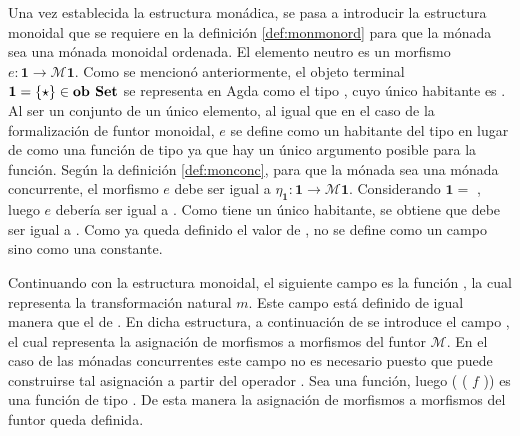 Una vez establecida la estructura monádica, se pasa a introducir la estructura monoidal que se requiere en la definición \ref{def:monmonord} para que la mónada sea una mónada monoidal ordenada. El elemento neutro es un morfismo $e : \mathbf{1} \rightarrow \mathcal{M} \mathbf{1}$. Como se mencionó anteriormente, el objeto terminal $\mathbf{1} = \{\star\} \in \text{\bf ob Set}$ se representa en Agda como el tipo \AgdaDatatype{$\top$}, cuyo único habitante es . Al ser un conjunto de un único elemento, al igual que en el caso de la formalización de funtor monoidal, $e$ se define como un habitante  del tipo  \AgdaDatatype{$\top$} en lugar de como una función de tipo \AgdaDatatype{$\top$} \AgdaSymbol{$\rightarrow$}  \AgdaDatatype{$\top$} ya que hay un único argumento posible para la función. Según la definición \ref{def:monconc}, para que la mónada sea una mónada concurrente, el morfismo $e$ debe ser igual a $\eta_{\mathbf{1}} : \mathbf{1} \rightarrow \mathcal{M} \mathbf{1}$. Considerando $\mathbf{1} =$ \AgdaDatatype{$\top$}, luego $e$ debería ser igual a  \AgdaSymbol{\{}\AgdaDatatype{$\top$}\AgdaSymbol{\} :} \AgdaDatatype{$\top$} \AgdaSymbol{$\rightarrow$}  \AgdaDatatype{$\top$}. Como \AgdaDatatype{$\top$} tiene un único habitante, se obtiene que  debe ser igual a   \AgdaSymbol{:}  \AgdaDatatype{$\top$}. Como ya queda definido el valor de , no se define como un campo sino como una constante.

Continuando con la estructura monoidal, el siguiente campo es la función , la cual representa la transformación natural $m$. Este campo está definido de igual manera que el  de . En dicha estructura, a continuación de  se introduce el campo , el cual representa la asignación de morfismos a morfismos del funtor $\mathcal{M}$. En el caso de las mónadas concurrentes este campo no es necesario puesto que puede construirse tal asignación a partir del operador \AgdaField{$\gg=$}. Sea  \AgdaSymbol{:}  \AgdaSymbol{$\rightarrow$}   una función, luego (\AgdaSymbol{$\lambda$}  \AgdaSymbol{$\rightarrow$}  \AgdaField{$\gg=$} (\AgdaSymbol{$\lambda$}  \AgdaSymbol{$\rightarrow$}  $f$ )) es una función de tipo  \AgdaSymbol{$\rightarrow$} . De esta manera la asignación de morfismos a morfismos del funtor queda definida. 

